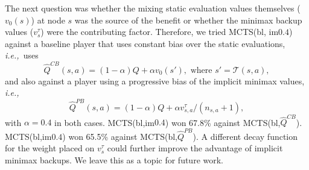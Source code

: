 \documentclass{article}
\newcommand{\cT}{\mathcal{T}}
\newcommand{\hQ}{\hat{Q}}
\newcommand{\ie}{{\it i.e.,}~}
\newcounter{mlNoteCounter}
\newcommand{\mlnote}[1]{{\scriptsize \color{darkgreen} $\blacksquare$ \refstepcounter{mlNoteCounter}\textsf{[ML]$_{\arabic{mlNoteCounter}}$:{#1}}}}
\begin{document}
 
The next question was whether the mixing static evaluation values themselves ($v_0(s)$) at node $s$ 
was the source of the benefit or whether the minimax backup values ($v^{\tau}_s$) were the contributing factor.
Therefore, we tried MCTS(bl, im$0.4$) against a baseline player that uses constant bias over the static 
evaluations, \ie uses 
\[ \hQ^{CB}(s,a) = (1-\alpha)Q + \alpha v_0(s'), \mbox{ where } s' = \cT(s,a),\]
and also against a player using a progressive bias of the implicit minimax values, \ie 
\[ \hQ^{PB}(s,a) = (1-\alpha)Q + \alpha v^{\tau}_{s,a}/(n_{s,a} + 1), \]
with $\alpha = 0.4$ in both cases.
MCTS(bl,im$0.4$) won 67.8\% against MCTS(bl,$\hQ^{CB}$). 
MCTS(bl,im$0.4$) won 65.5\% against MCTS(bl,$\hQ^{PB}$). 
A different decay function for the weight placed on $v^{\tau}_s$ could further improve 
the advantage of implicit minimax backups. We leave this as a topic for future work. 
\end{document}
